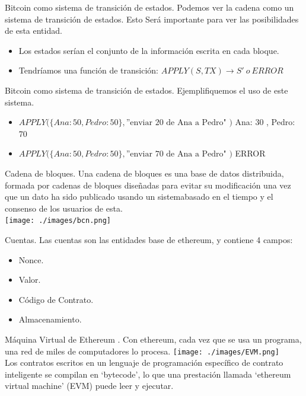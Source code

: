 \documentclass[usenames,dvipsnames]{beamer}
\begin{document}
\begin{frame}{ Bitcoin como sistema de transición de estados. }
Podemos ver la cadena como un sistema de transición de estados. Esto Será importante para ver las posibilidades de esta entidad.
\begin{itemize}
	\item Los estados serían el conjunto de la información escrita en cada bloque.
  	\item Tendríamos una  función de transición: $ APPLY( S , TX ) \to S'\ o\ ERROR$
\end{itemize}
\end{frame}


\begin{frame}{ Bitcoin como sistema de transición de estados. }
Ejemplifiquemos el uso de este sistema.
\begin{itemize}
	\item $ APPLY( \{ Ana: 50 , Pedro: 50 \} , \text{''enviar 20 de Ana a Pedro" )} $
  { Ana: 30 , Pedro: 70 }
  \item  $  APPLY( \{ Ana: 50 , Pedro: 50 \} , \text{''enviar 70 de Ana a Pedro" )} $
  ERROR
\end{itemize}
\end{frame}


\begin{frame} {Cadena de bloques.}
Una cadena de bloques es una base de datos distribuida, formada por cadenas de bloques
diseñadas para evitar su modificación una vez que un dato ha sido publicado usando un sistemabasado en el tiempo y el consenso de los usuarios de esta.\\
\vspace{0.3cm}
\texttt{[image: ./images/bcn.png]}
\end{frame}

\begin{frame}{ Cuentas. }
	Las cuentas son las entidades base de ethereum, y contiene 4 campos:
	\begin{itemize}
	\item Nonce.
	\item Valor.
	\item Código de Contrato.
	\item Almacenamiento.
	\end{itemize}
\end{frame}


\begin{frame}{ Máquina Virtual de Ethereum . }
Con ethereum, cada vez que se usa un programa, una red de miles de computadores lo procesa. 
\texttt{[image: ./images/EVM.png]}\\Los contratos escritos en un lenguaje de programación específico de contrato inteligente se compilan en ‘bytecode’, lo que una prestación llamada ‘ethereum virtual machine’ (EVM) puede leer y ejecutar.
\end{frame}
\end{document}
